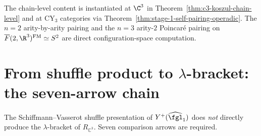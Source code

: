 The chain-level content is instantiated at $\C^3$ in
Theorem~\ref{thm:c3-koszul-chain-level} and at CY$_3$ categories via
Theorem~\ref{thm:stage-1-self-pairing-operadic}. The
$n = 2$ arity-by-arity pairing and the $n = 3$ arity-$2$ Poincar\'e pairing
on $\overline{F}(2, \R^3)^{\mathrm{FM}} \simeq S^2$ are direct
configuration-space computation.



\section{From shuffle product to \texorpdfstring{$\lambda$}{lambda}-bracket: the seven-arrow chain}
\label{sec:shuffle-to-lambda}

The Schiffmann--Vasserot shuffle presentation of $Y^+(\widehat{\fgl}_1)$ does \emph{not} directly produce the $\lambda$-bracket of $R_{\mathbb{C}^3}$. Seven comparison arrows are required.


